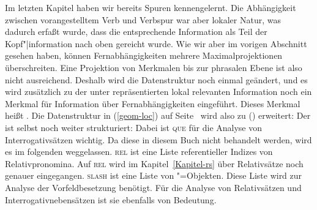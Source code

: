 Im letzten Kapitel haben wir bereits Spuren kennengelernt. Die Abhängigkeit zwischen vorangestelltem
Verb und Verbspur war aber lokaler Natur, was dadurch erfaßt wurde, dass die entsprechende Information
als Teil der Kopf"|information nach oben gereicht wurde. Wie wir aber im vorigen Abschnitt gesehen haben,
können Fernabhängigkeiten mehrere Maximalprojektionen überschreiten. Eine Projektion von Merkmalen
bis zur phrasalen Ebene ist also nicht ausreichend. Deshalb wird die Datenstruktur noch einmal geändert,
und es wird zusätzlich zu der unter \local repräsentierten lokal relevanten Information noch ein
Merkmal für Information über Fernabhängigkeiten eingeführt. Dieses Merkmal heißt \nonloc.
Die Datenstruktur in (\ref{geom-loc}) auf Seite~\pageref{geom-loc} wird also zu () erweitert:
\ea
\label{geom-nonloc}
\z
Der \nonlocw ist selbst noch weiter strukturiert:
\ea
{}
\z
Dabei ist \textsc{que} für die Analyse von Interrogativsätzen wichtig. Da diese in diesem Buch nicht behandelt
werden, wird es im folgenden weggelassen. \textsc{rel} ist eine Liste referentieller Indizes von Relativpronomina. Auf
\textsc{rel} wird im Kapitel~\ref{Kapitel-rs} über Relativsätze noch genauer eingegangen.
\textsc{slash} ist eine Liste von "=Objekten. Diese Liste wird zur Analyse
der Vorfeldbesetzung benötigt. Für die Analyse von Relativsätzen und Interrogativnebensätzen
ist sie ebenfalls von Bedeutung.


